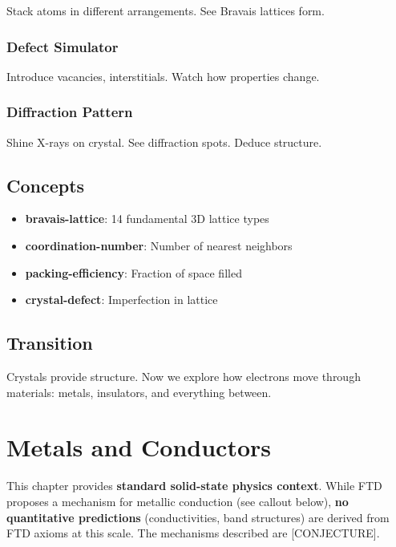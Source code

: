 \documentclass[
  11pt,
  letterpaper,
  twoside,
  openright]{book}
\providecommand{\tightlist}{%
  \setlength{\itemsep}{0pt}\setlength{\parskip}{0pt}}
\begin{document}
Stack atoms in different arrangements. See Bravais lattices form.

\subsection{Defect Simulator}\label{defect-simulator}

Introduce vacancies, interstitials. Watch how properties change.

\subsection{Diffraction Pattern}\label{diffraction-pattern}

Shine X-rays on crystal. See diffraction spots. Deduce structure.

\section{Concepts}\label{concepts-11}

\begin{itemize}
\tightlist
\item
  \textbf{bravais-lattice}: 14 fundamental 3D lattice types
\item
  \textbf{coordination-number}: Number of nearest neighbors
\item
  \textbf{packing-efficiency}: Fraction of space filled
\item
  \textbf{crystal-defect}: Imperfection in lattice
\end{itemize}

\section{Transition}\label{transition-11}

Crystals provide structure. Now we explore how electrons move through
materials: metals, insulators, and everything between.

\chapter{Metals and Conductors}\label{sec-metals-conductors}

\begin{tcolorbox}[enhanced jigsaw, coltitle=black, colbacktitle=quarto-callout-warning-color!10!white, toprule=.15mm, colframe=quarto-callout-warning-color-frame, arc=.35mm, opacityback=0, bottomtitle=1mm, toptitle=1mm, breakable, colback=white, titlerule=0mm, opacitybacktitle=0.6, title=\textcolor{quarto-callout-warning-color}{\faExclamationTriangle}\hspace{0.5em}{Pedagogical Context {[}NOT DERIVED FROM FTD{]}}, rightrule=.15mm, bottomrule=.15mm, leftrule=.75mm, left=2mm]

This chapter provides \textbf{standard solid-state physics context}.
While FTD proposes a mechanism for metallic conduction (see callout
below), \textbf{no quantitative predictions} (conductivities, band
structures) are derived from FTD axioms at this scale. The mechanisms
described are {[}CONJECTURE{]}.

\end{tcolorbox}
\end{document}
